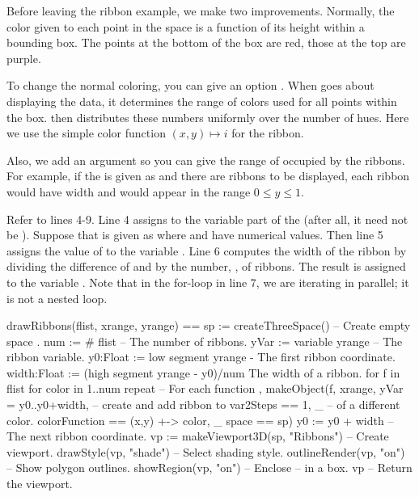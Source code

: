 %

Before leaving the ribbon example, we  make two improvements.
Normally, the color given to each point in the space is a
function of its height within a bounding box.
The points at the bottom of the
box are red, those at the top are purple.

To change the normal coloring, you can give
an option .
When \Language{} goes about displaying the data, it
determines the range of colors used for all points within the box.
\Language{} then distributes these numbers uniformly over the number of hues.
Here we use the simple color function
$(x,y) \mapsto i$ for the
 ribbon.

Also, we add an argument  so you can give the range of
 occupied by the ribbons.
For example, if the  is given as
 and there are  ribbons to be displayed, each
ribbon would have width  and would appear in the
range $0 \leq y \leq 1$.

Refer to lines 4-9.
Line 4 assigns to  the variable part of the
 (after all, it need not be ).
Suppose that  is given as  where  and
 have numerical values.
Then line 5 assigns the value of  to the variable .
Line 6 computes the width of the ribbon by dividing the difference of
 and  by the number, , of ribbons.
The result is assigned to the variable .
Note that in the for-loop in line 7, we are iterating in parallel; it is
not a nested loop.

\begin{figXmpLines}[caption={The final \protect\pspadfun{drawRibbons} function.}]
drawRibbons(flist, xrange, yrange) ==
  sp := createThreeSpace()                     -- Create empty space .
  num := # flist                               -- The number of ribbons.
  yVar := variable yrange                      -- The ribbon variable.
  y0:Float    := low segment yrange             - The first ribbon coordinate.
  width:Float := (high segment yrange - y0)/num   The width of a ribbon.
  for f in flist for color in 1..num repeat    -- For each function ,
    makeObject(f, xrange, yVar = y0..y0+width, -- \quad{}create and add ribbon to
      var2Steps == 1, _                        -- \quad{} of a different color.
      colorFunction == (x,y) +-> color, _
      space == sp)
    y0 := y0 + width                           -- The next ribbon coordinate.
  vp := makeViewport3D(sp, "Ribbons")          -- Create viewport.
  drawStyle(vp, "shade")                       -- Select shading style.
  outlineRender(vp, "on")                      -- Show polygon outlines.
  showRegion(vp, "on")                         -- Enclose -- in a box.
  vp                                           -- Return the viewport.
\end{figXmpLines}


